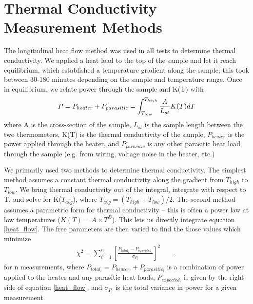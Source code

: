 \documentclass[final]{svjour2}
\begin{document}
\section{Thermal Conductivity Measurement Methods}
The longitudinal heat flow method was used in all tests to determine thermal conductivity. We applied a heat load to the top of the sample and let it reach equilibrium, which established a temperature gradient along the sample; this took between 30-180 minutes depending on the sample and temperature range. Once in equilibrium, we relate power through the sample and K(T) with
\begin{equation}
P = P_{heater} + P_{parasitic} = \int_{T_{low}}^{T_{high}} \frac{A}{L_{st}} K(T)dT\\
\label{heat_flow}
\end{equation}
where A is the cross-section of the sample, $L_{st}$ is the sample length between the two thermometers, K(T) is the thermal conductivity of the sample, $P_{heater}$ is the power applied through the heater, and $P_{parasitic}$ is any other parasitic heat load through the sample (e.g. from wiring, voltage noise in the heater, etc.)

We primarily used two methods to determine thermal conductivity. The simplest method assumes a constant thermal conductivity\footnotemark {} along the gradient from $T_{high}$ to $T_{low}$. We bring thermal conductivity out of the integral, integrate with respect to T, and solve for K($T_{avg}$), where $T_{avg} = (T_{high} + T_{low})/2$. The second method assumes a parametric form for thermal conductivity -- this is often a power law at low temperatures ($K(T) = A \times T^B$). This lets us directly integrate equation \ref{heat_flow}. The free parameters are then varied to find the those values which minimize
\begin{eqnarray}
\chi^2 = \sum_{i = 1}^{n} \left[\frac{P_{total_i} - P_{expected_i}}{\sigma_{P_i}}\right]^2 \qquad ,
\label{param}
\end{eqnarray}
for n measurements, where $P_{total_i} = P_{heater_i} + P_{parasitic_i}$ is a combination of power applied to the heater and any parasitic heat loads, $P_{expected_i}$ is given by the right side of equation \ref{heat_flow}, and $\sigma_{P_i}$ is the total variance in power for a given measurement.
\end{document}
